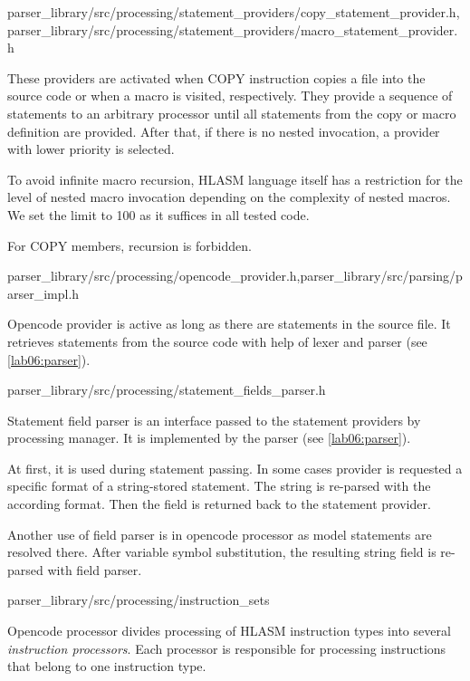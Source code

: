 {parser\_library/src/processing/statement\_providers/copy\_statement\_provider.h,parser\_library/src/processing/statement\_providers/macro\_statement\_provider.h}

These providers are activated when COPY instruction copies a file into the source code or when a macro is visited, respectively. They provide a sequence of statements to an arbitrary processor until all statements from the copy or macro definition are provided. After that, if there is no nested invocation, a provider with lower priority is selected.

To avoid infinite macro recursion, HLASM language itself has a restriction for the level of nested macro invocation depending on the complexity of nested macros. We set the limit to 100 as it suffices in all tested code.

For COPY members, recursion is forbidden.

{parser\_library/src/processing/opencode\_provider.h,parser\_library/src/parsing/parser\_impl.h}

Opencode provider is active as long as there are statements in the source file. It retrieves statements from the source code with help of lexer and parser (see \cref{lab06:parser}).

{parser\_library/src/processing/statement\_fields\_parser.h}
\label{lab06:field_parser}

Statement field parser is an interface passed to the statement providers by processing manager. It is implemented by the parser (see \cref{lab06:parser}).

At first, it is used during statement passing. In some cases provider is requested a specific format of a string-stored statement. The string is re-parsed with the according format. Then the field is returned back to the statement provider. 

Another use of field parser is in opencode processor as model statements are resolved there. After variable symbol substitution, the resulting string field is re-parsed with field parser.

{parser\_library/src/processing/instruction\_sets}
\label{lab06:instr_proc}

Opencode processor divides processing of HLASM instruction types into several \emph{instruction processors}. Each processor is responsible for processing instructions that belong to one instruction type.

